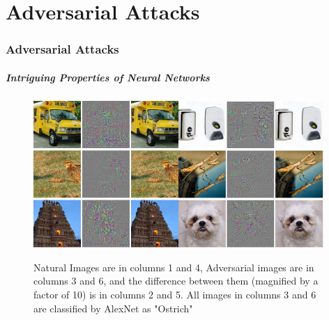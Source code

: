 \part{Adversarial Attacks}

\label{Chapter2} %

\section{Adversarial Attacks}

\begin{frame}
  \frametitle{Intriguing Properties of Neural Networks \cite{Szegedy2013}}
\begin{figure}[H]
    \centering
\includegraphics[width=5.5cm]{szegedy/negative1.png}\includegraphics[width=5.5cm]{szegedy/negative2.png}
    \caption{Natural Images are in columns 1 and 4, Adversarial images are in columns 3 and 6, and the difference between them (magnified by a factor of 10) is in columns 2 and 5. All images in columns 3 and 6 are classified by AlexNet as "Ostrich" \cite{Szegedy2013}}
    \label{fig:my_label}
\end{figure}
\end{frame}



